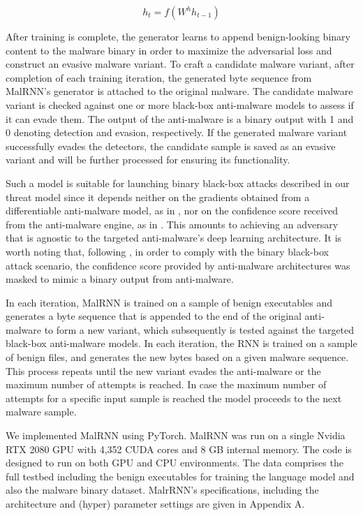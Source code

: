 \documentclass[letterpaper]{article}
\newcommand{\malrnn}{M\lowercase{a}lRNN }
\begin{document}
\begin{equation}
  h_t = f(W^{h}h_{t-1})
  \label {decoder_hidden}
\end{equation}

 After training is complete, the generator learns to append benign-looking binary content to the malware binary in order to maximize the adversarial loss and construct an evasive malware variant. To craft a candidate malware variant, after completion of each training iteration, the generated byte sequence from MalRNN's generator is attached to the original malware. The candidate malware variant is checked against one or more black-box anti-malware models to assess if it can evade them. The output of the anti-malware is a binary output with 1 and 0 denoting detection and evasion, respectively. If the generated malware variant successfully evades the detectors, the candidate sample is saved as an evasive variant and will be further processed for ensuring its functionality. 

Such a model is suitable for launching binary black-box attacks described in our threat model since it depends neither on the gradients obtained from a differentiable anti-malware model, as in \cite{castroandbiggio2019poster,kolosnjaji2018adversarial}, nor on the confidence score received from the anti-malware engine, as in \cite{chen2017zoo}. This amounts to achieving an adversary that is agnostic to the targeted anti-malware's deep learning architecture. It is worth noting that, following \cite{anderson2018learning}, in order to comply with the binary black-box attack scenario, the confidence score provided by anti-malware architectures was masked to mimic a binary output from anti-malware.

In each iteration, \malrnn is trained on a sample of benign executables and generates a byte sequence that is appended to the end of the original anti-malware to form a new variant, which subsequently is tested against the targeted black-box anti-malware models. In each iteration, the RNN is trained on a sample of benign files, and generates the new bytes based on a given malware sequence. This process repeats until the new variant evades the anti-malware or the maximum number of attempts is reached. In case the maximum number of attempts for a specific input sample is reached the model proceeds to the next malware sample.

We implemented \malrnn using PyTorch. \malrnn was run on a single Nvidia RTX 2080 GPU with 4,352 CUDA cores and 8 GB internal memory. The code is designed to run on both GPU and CPU environments. The data comprises the full testbed including the benign executables for training the language model and also the malware binary dataset. MalrRNN's specifications, including the architecture and (hyper) parameter settings are given in Appendix A.
\end{document}
